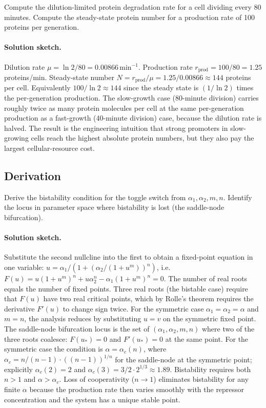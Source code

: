 \begin{exercise}
Compute the dilution-limited protein degradation rate for a cell
dividing every 80 minutes. Compute the steady-state protein number
for a production rate of 100 proteins per generation.

\paragraph{Solution sketch.}
Dilution rate $\mu = \ln 2 / 80 = 0.00866\,\text{min}^{-1}$.
Production rate $r_{\text{prod}} = 100/80 = 1.25$ proteins/min.
Steady-state number $N = r_{\text{prod}}/\mu = 1.25/0.00866 \approx
144$ proteins per cell. Equivalently $100/\ln 2 \approx 144$ since
the steady state is $(1/\ln 2)$ times the per-generation
production. The slow-growth case (80-minute division) carries
roughly twice as many protein molecules per cell at the same
per-generation production as a fast-growth (40-minute division) case,
because the dilution rate is halved. The result is the engineering
intuition that strong promoters in slow-growing cells reach the
highest absolute protein numbers, but they also pay the largest
cellular-resource cost.
\end{exercise}

\subsection*{Derivation}

\begin{exercise}
Derive the bistability condition for the toggle switch from
$\alpha_1, \alpha_2, m, n$. Identify the locus in parameter space
where bistability is lost (the saddle-node bifurcation).

\paragraph{Solution sketch.}
Substitute the second nullcline into the first to obtain a
fixed-point equation in one variable:
$u = \alpha_1/(1 + (\alpha_2/(1+u^{m}))^{n})$, i.e.\
$F(u) = u(1 + u^{m})^{n} + u \alpha_2^{n} - \alpha_1 (1 + u^{m})^{n} = 0$.
The number of real roots equals the number of fixed points. Three
real roots (the bistable case) require that $F(u)$ have two real
critical points, which by Rolle's theorem requires the derivative
$F'(u)$ to change sign twice. For the symmetric case
$\alpha_1 = \alpha_2 = \alpha$ and $m = n$, the analysis reduces by
substituting $u = v$ on the symmetric fixed point. The
saddle-node bifurcation locus is the set of $(\alpha_1, \alpha_2, m, n)$
where two of the three roots coalesce: $F(u_{*}) = 0$ and
$F'(u_{*}) = 0$ at the same point. For the symmetric case the
condition is $\alpha = \alpha_{c}(n)$, where
$\alpha_{c} = n/(n-1) \cdot ((n-1))^{1/n}$ for the saddle-node at
the symmetric point; explicitly $\alpha_{c}(2) = 2$ and
$\alpha_{c}(3) = 3/2 \cdot 2^{1/3} \approx 1.89$. Bistability
requires both $n > 1$ and $\alpha > \alpha_{c}$. Loss of cooperativity
($n \to 1$) eliminates bistability for any finite $\alpha$ because
the production rate then varies smoothly with the repressor
concentration and the system has a unique stable point.
\end{exercise}

